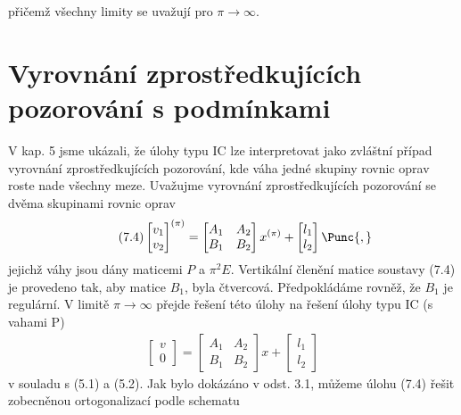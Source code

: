 %
přičemž všechny limity se uvažují pro $\pi \rightarrow \infty$.



\section{Vyrovnání zprostředkujících pozorování s podmínkami}

V kap. 5  jsme ukázali, že úlohy typu IC lze interpretovat
jako zvláštní případ vyrovnání zprostředkujících pozorování, kde váha
jedné skupiny rovnic oprav roste nade všechny meze.  Uvažujme
vyrovnání zprostředkujících pozorování se dvěma skupinami rovnic oprav
%
\begin{align*}
  \tag{7.4}
  \begin{bmatrix}
    v_1 \\ v_2
  \end{bmatrix}^{(\pi)} =
  \begin{bmatrix}
    A_1 & A_2 \\ B_1 & B_2
  \end{bmatrix} x^{(\pi)} +
  \begin{bmatrix}
    l_1 \\ l_2
  \end{bmatrix} \Punc{,}
\end{align*}
%
jejichž váhy jsou dány maticemi $P$ a $\pi^2E$. Vertikální členění
matice soustavy (7.4) je provedeno tak, aby matice $B_1$, byla
čtvercová. Předpokládáme rovněž, že $B_1$ je regulární. V limitě $\pi
\rightarrow \infty$ přejde řešení této úlohy na řešení úlohy typu IC
(s vahami P)
\begin{align*}
  \tag{7.5}
  \begin{bmatrix}
    v \\ 0
  \end{bmatrix} =
  \begin{bmatrix}
    A_1 & A_2 \\ B_1 & B_2
  \end{bmatrix} x +
  \begin{bmatrix}
    l_1 \\ l_2
  \end{bmatrix}
\end{align*}
%
v souladu s (5.1) a (5.2). Jak bylo dokázáno v odst. 3.1,
můžeme úlohu (7.4) řešit zobecněnou ortogonalizací podle schematu
%
